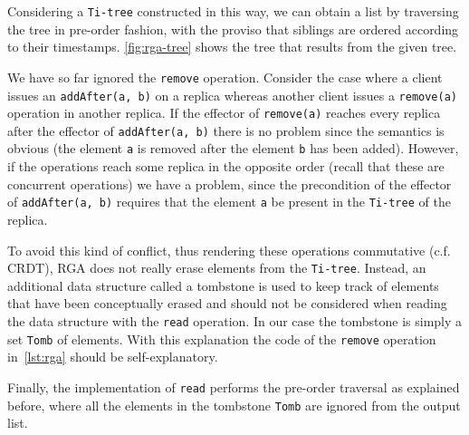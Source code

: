 Considering a \lstinline|Ti-tree| constructed in this way, we can
obtain a list by traversing the tree in pre-order fashion, with the
proviso that siblings are ordered according to their timestamps. 
%
\autoref{fig:rga-tree} shows the tree that results from the given
tree. 

We have so far ignored the \lstinline|remove| operation.
%
Consider the case where a client issues an \lstinline|addAfter(a, b)|
on a replica whereas another client issues a \lstinline|remove(a)|
operation in another replica. 
%
If the effector of \lstinline|remove(a)| reaches every replica after
the effector of \lstinline|addAfter(a, b)| there is no problem since
the semantics is obvious (the element \lstinline|a| is removed after
the element \lstinline|b| has been added). 
%
However, if the operations reach some replica in the opposite order
(recall that these are concurrent operations) we have a problem, since
the precondition of the effector of \lstinline|addAfter(a, b)|
requires that the element \lstinline|a| be present in the
\lstinline|Ti-tree| of the replica.

To avoid this kind of conflict, thus rendering these operations
commutative (c.f. CRDT), RGA does not really erase elements from the
\lstinline|Ti-tree|.
%
Instead, an additional data structure called a tombstone is used to
keep track of elements that have been conceptually erased and should
not be considered when reading the data structure with the
\lstinline|read| operation. 
%
In our case the tombstone is simply a set \lstinline|Tomb| of
elements. 
%
With this explanation the code of the \lstinline|remove| operation
in~\autoref{lst:rga} should be self-explanatory. 

Finally, the implementation of \lstinline|read| performs the pre-order
traversal as explained before, where all the elements in the tombstone
\lstinline|Tomb| are ignored from the output list. 



